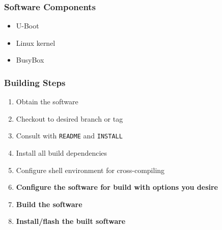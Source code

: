 \documentclass[aspectratio=169]{beamer}
\begin{document}
\begin{frame}
  \frametitle{Software Components}
  \begin{itemize}
    \item U-Boot
    \item Linux kernel
    \item BusyBox
  \end{itemize}
  \bigskip
  \begin{overlayarea}{\textwidth}{.4\textheight}
  \end{overlayarea}
\end{frame}

\begin{frame}
  \frametitle{Building Steps}
  \begin{enumerate}
    \item Obtain the software
    \item Checkout to desired branch or tag
    \item Consult with \texttt{README} and \texttt{INSTALL}
    \item Install all build dependencies
    \item Configure shell environment for cross-compiling
    \item \textbf{Configure the software for build with options you desire}
    \item \textbf{Build the software}
    \item \textbf{Install/flash the built software}
  \end{enumerate}
\end{frame}
\end{document}
